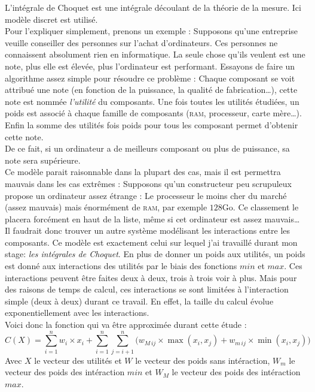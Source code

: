 
L'intégrale de Choquet est une intégrale découlant de la théorie de la mesure\cite{artch}.
Ici modèle discret est utilisé.\\


Pour l'expliquer simplement, prenons un exemple :
Supposons qu'une entreprise veuille conseiller des personnes sur l'achat d'ordinateurs.
Ces personnes ne connaissent absolument rien en informatique.
La seule chose qu'ils veulent est une note, plus elle est élevée, plus l'ordinateur est performant.
Essayons de faire un algorithme assez simple pour résoudre ce problème :
Chaque composant se voit attribué une note (en fonction de la puissance, la qualité de fabrication\ldots),
cette note est nommée \textit{l'utilité} du composants.
Une fois toutes les utilités étudiées, un poids est associé à chaque famille de composants
(\textsc{ram}, processeur, carte mère\ldots).
Enfin la somme des utilités fois poids pour tous les composant permet d'obtenir cette note.\\
De ce fait, si un ordinateur a de meilleurs composant ou plus de puissance, sa note sera supérieure.\\


Ce modèle parait raisonnable dans la plupart des cas, mais il est permettra mauvais dans les cas extrêmes :
Supposons qu'un constructeur peu scrupuleux propose un ordinateur assez étrange :
Le processeur le moins cher du marché (assez mauvais) mais énormément de \textsc{ram}, par exemple $128$Go.
Ce classement le placera forcément en haut de la liste,
même si cet ordinateur est assez mauvais\ldots\\


Il faudrait donc trouver un autre système modélisant les interactions entre les composants.
Ce modèle est exactement celui sur lequel j'ai travaillé durant mon stage: \textit{les intégrales de Choquet}.
En plus de donner un poids aux utilités,
un poids est donné aux interactions des utilités par le biais des fonctions $min$ et $max$.
Ces interactions peuvent être faites deux à deux, trois à trois voir à plus.
Mais pour des raisons de temps de calcul, ces interactions se sont limitées à l'interaction simple
(deux à deux) durant ce travail.
En effet, la taille du calcul évolue exponentiellement avec les interactions.\\


Voici donc la fonction qui va être approximée durant cette étude :
\begin{equation}
    \label{eq:Choquet}
    C(X)  =
    \sum_{i=1}^{n}
        w_i \times x_i +
    \sum_{i=1}^{n}\sum_{j=i+1}^{n}
    \Big(
        w_{M\,ij} \times \max(x_i,x_j) + w_{m\,ij} \times \min(x_i,x_j)
    \Big)
\end{equation}
Avec $X$ le vecteur des utilités et $W$ le vecteur des poids sans intéraction,
$W_m$ le vecteur des poids des intéraction $min$
et $W_M$ le vecteur des poids des intéraction $max$.
